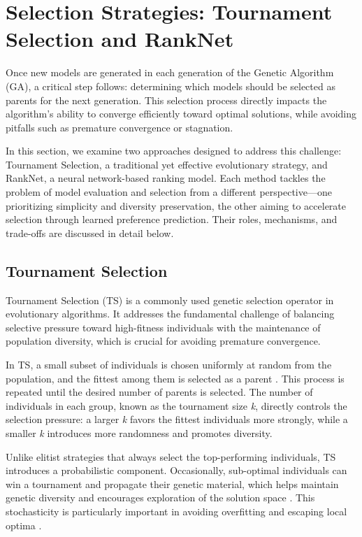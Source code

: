 \section{Selection Strategies: Tournament Selection and RankNet}

Once new models are generated in each generation of the Genetic Algorithm (GA), a critical step follows: determining which models should be selected as parents for the next generation. This selection process directly impacts the algorithm’s ability to converge efficiently toward optimal solutions, while avoiding pitfalls such as premature convergence or stagnation.

In this section, we examine two approaches designed to address this challenge: Tournament Selection, a traditional yet effective evolutionary strategy, and RankNet, a neural network-based ranking model. Each method tackles the problem of model evaluation and selection from a different perspective—one prioritizing simplicity and diversity preservation, the other aiming to accelerate selection through learned preference prediction. Their roles, mechanisms, and trade-offs are discussed in detail below.

\subsection{Tournament Selection}
Tournament Selection (TS) is a commonly used genetic selection operator in evolutionary algorithms. It addresses the fundamental challenge of balancing selective pressure toward high-fitness individuals with the maintenance of population diversity, which is crucial for avoiding premature convergence.

In TS, a small subset of individuals is chosen uniformly at random from the population, and the fittest among them is selected as a parent \cite{hussain2020trade}. This process is repeated until the desired number of parents is selected. The number of individuals in each group, known as the tournament size \textit{k}, directly controls the selection pressure: a larger \textit{k} favors the fittest individuals more strongly, while a smaller \textit{k} introduces more randomness and promotes diversity.

Unlike elitist strategies that always select the top-performing individuals, TS introduces a probabilistic component. Occasionally, sub-optimal individuals can win a tournament and propagate their genetic material, which helps maintain genetic diversity and encourages exploration of the solution space \cite{hussain2020trade}. This stochasticity is particularly important in avoiding overfitting and escaping local optima \cite{filipovic2003fine}.

